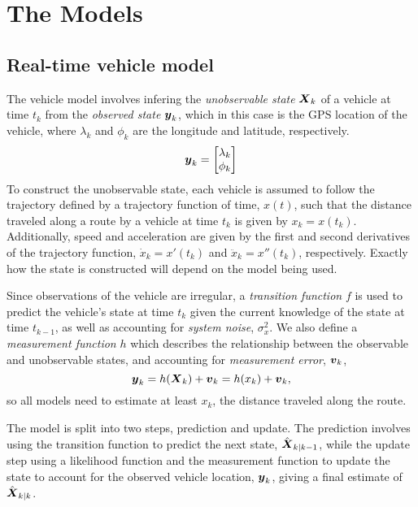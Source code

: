 \section{The Models}
\label{sec:models}

\subsection{Real-time vehicle model}
\label{sec:pf}

The vehicle model involves infering the \emph{unobservable state} $\mbox{$\boldsymbol{X}$}_k$ 
of a vehicle at time $t_k$ from the \emph{observed state} $\mbox{$\boldsymbol{y}$}_k$,
which in this case is the GPS location of the vehicle,
where $\lambda_k$ and $\phi_k$ are the longitude and latitude, respectively.
\begin{equation}
\label{eq:vehicle_observation}
\mbox{$\boldsymbol{y}$}_k = \begin{bmatrix} \lambda_k \\ \phi_k \end{bmatrix}
\end{equation}
To construct the unobservable state, 
each vehicle is assumed to follow the trajectory defined by a trajectory function of time, $x(t)$,
such that the distance traveled along a route by a vehicle at time $t_k$ is given by
$x_k = x(t_k)$.
Additionally, speed and acceleration are given by
the first and second derivatives of the trajectory function,
$\dot x_k = x'(t_k)$ and $\ddot x_k = x''(t_k)$, respectively.
Exactly how the state is constructed will depend on the model being used.


Since observations of the vehicle are irregular, 
a \emph{transition function} $f$ is used to
predict the vehicle's state at time $t_k$ given the current knowledge of the state at time $t_{k-1}$,
as well as accounting for \emph{system noise}, $\sigma_x^2$.
We also define a \emph{measurement function} $h$ which describes the relationship between
the observable and unobservable states,
and accounting for \emph{measurement error}, $\boldsymbol{v}_k$,
\begin{equation}
\label{eq:vehicle_measurement}
\mbox{$\boldsymbol{y}$}_k = h(\mbox{$\boldsymbol{X}$}_k) + \boldsymbol{v}_k = h(x_k) + \boldsymbol{v}_k,
\end{equation}
so all models need to estimate at least $x_k$, the distance traveled along the route.


The model is split into two steps, prediction and update.
The prediction involves using the transition function to predict
the next state, $\hat{\mbox{$\boldsymbol{X}$}}_{k|k-1}$,
while the update step using a likelihood function and the measurement function
to update the state to account for the observed vehicle location, $\mbox{$\boldsymbol{y}$}_k$,
giving a final estimate of $\hat{\mbox{$\boldsymbol{X}$}}_{k|k}$.


